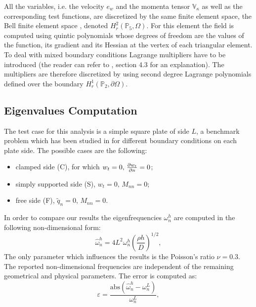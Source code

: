 \documentclass[11pt]{article}
\begin{document}
{		All the variables, i.e. the velocity $e_w$ and the momenta tensor $\mathbb{V}_\kappa$ as well as the corresponding test functions, are discretized by the same finite element space, the Bell finite element space \cite{Bell}, denoted $H_r^2(\mathbb{P}_5, \Omega)$. For this element the field is computed using quintic polynomials whose degrees of freedom are the values of the function, its gradient and its Hessian at the vertex of each triangular element. To deal with mixed boundary conditions Lagrange multipliers have to be introduced (the reader can refer to \cite{BrugnoliMin}, section 4.3 for an explanation). The multipliers are therefore discretized by using second degree Lagrange polynomials defined over the boundary $H_r^1(\mathbb{P}_2, \partial\Omega)$. 
		\subsection{Eigenvalues Computation}
		\label{sec:Eigen}
		The test case for this analysis is a simple square plate of side $L$, a benchmark problem which has been studied in \cite{LeissaRect, LimEigen} for different boundary conditions on each plate side. The possible cases are the following: 
		\begin{itemize}
			\item clamped side (C), for which $w_t = 0, \, \diffp{w_t}{n}=0$; 
			\item simply supported side (S), $w_t = 0, \, M_{nn}=0$;
			\item free side (F), $\widetilde{q}_n = 0, \, M_{nn}=0$.
		\end{itemize}
		In order to compare our results the eigenfrequencies $\omega_{n}^h$ are computed in the following non-dimensional form:
		\begin{equation}
		\widehat{\omega}_{n}^h = 4 L^2 \omega_{n}^h \left(\frac{\rho h}{D} \right)^{1/2},
		\end{equation}
		The only parameter which influences the results is the Poisson's ratio $\nu=0.3$. The reported non-dimensional frequencies are independent of the remaining geometrical and physical parameters.  The error is computed as:
		\begin{equation}
		\varepsilon = \frac{\text{abs}(\widehat{\omega}_{n}^h - \omega_{n}^{L})}{\omega_{n}^{L}},
		\end{equation}
}
\end{document}
